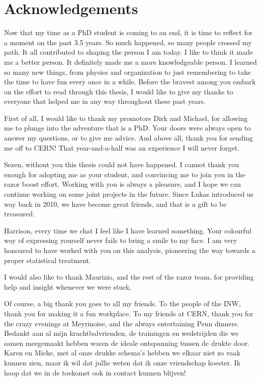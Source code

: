 \chapter*{Acknowledgements \label{sec:acknowledgements}}

Now that my time as a PhD student is coming to an end, it is time to reflect for a moment on the
past 3.5 years. So much happened, so many people crossed my path. It all contributed to shaping the
person I am today. I like to think it made me a better person. It definitely made me a more
knowledgeable person. 
I learned so many new things, from physics and organization to just remembering to take the time to
have fun every once in a while. 
Before the bravest among you embark on the effort to read through this thesis, I would like to give
my thanks to everyone that helped me in any way throughout these past years. 

First of all, I would like to thank my promotors Dirk and Michael, for allowing me to plunge into
the adventure that is a PhD. Your doors were always open to answer my questions, or to give me
advice. And above all, thank you for sending me off to CERN! That year-and-a-half was an
experience I will never forget. 

Sezen, without you this thesis could not have happened. I cannot thank you enough for adopting me
as your student, and convincing me to join you in the razor boost effort. Working with you is
always a pleasure, and I hope we can continue working on some joint projects in the future. Since
Lukas introduced us way back in 2010, we have become great friends, and that is a gift to be
treasured. 

Harrison, every time we chat I feel like I have learned something. Your colourful way of expressing
yourself never fails to bring a smile to my face. I am very honoured to have worked with you on
this analysis, pioneering the way towards a proper statistical treatment. 

I would also like to thank Maurizio, and the rest of the razor team, for providing help and insight
whenever we were stuck. 

Of course, a big thank you goes to all my friends. To the people of the INW, thank you for making
it a fun workplace. To my friends at CERN, thank you for the crazy evenings at Meyrinoise, and the
always entertaining Penn dinners. 
Bedankt aan al mijn krachtbalvrienden, de trainingen en wedstrijden die we samen meegemaakt hebben
waren de ideale ontspanning tussen de drukte door. 
Karen en Mieke, met al onze drukke schema's hebben we elkaar niet zo vaak kunnen zien, maar ik wil
dat jullie weten dat ik onze vriendschap koester. Ik hoop dat we in de toekomst ook in contact
kunnen blijven!


